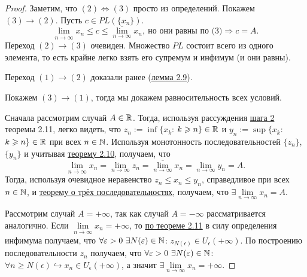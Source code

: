 \begin{proof}
    Заметим, что $(2) \Leftrightarrow (3)$ просто из определений. Покажем $(3) \to (2)$. Пусть $c \in PL (\{ x_{n} \})$.
    $$ \lim\limits_{\overline{n\to \infty}} x_{n} \leq c \leq \overline{\lim\limits_{n\to \infty}} x_{n}, \  \text{но они равны по (3)} \Rightarrow c = A. $$ Переход $(2) \to (3)$ очевиден. Множество $PL$ состоит всего из одного элемента, то есть крайне легко взять его супремум и инфимум (и они равны).

    Переход $(1) \to (2)$ доказали ранее (\hyperlink{lemm2.9}{лемма 2.9}).

    Покажем $(3) \to (1)$, тогда мы докажем равносительность всех условий.

    Сначала рассмотрим случай $A \in \mathbb{R}$. Тогда, используя рассуждения \hyperlink{step2}{шага 2} теоремы 2.11, легко видеть, что $z_{n} := \inf \{ x_{k}$: $k \geqslant n\} \in \mathbb{R}$ и $y_{n} := \sup \{ x_{k}$: $k \geqslant n\} \in \mathbb{R}$ при всех $n \in \mathbb{N}$. Используя монотонность последовательностей $\{ z_{n} \}$, $\{ y_{n} \}$ и учитывая \hyperlink{thm2.10}{теорему 2.10}, получаем, что
    $$ \lim\limits_{\overline{n\to \infty}} x_{n} = \lim\limits_{n\to \infty} z_{n} = \overline{\lim\limits_{n\to \infty}} x_{n} = \lim\limits_{n\to \infty} y_{n} = A.$$
    Тогда, используя очевидное неравенство $z_{n} \leq x_{n} \leq y_{n}$, справедливое при всех $n \in \mathbb{N}$, и \hyperlink{thm2.4}{теорему о трёх последовательностях}, получаем, что $\exists \lim\limits_{n\to \infty} x_{n} = A$.
    
    Рассмотрим случай $A = +\infty$, так как случай $A = -\infty$ рассматривается аналогично. Если $\lim\limits_{\overline{n\to \infty}} x_{n} = +\infty$, то \hyperlink{thm2.11}{по теореме 2.11} в силу определения инфимума получаем, что $\forall \varepsilon > 0 \  \exists N (\varepsilon) \in \mathbb{N}$: $z_{N (\epsilon)} \in U_{\epsilon} (+ \infty)$. По построению последовательности $z_{n}$ получаем, что $\forall \varepsilon > 0 \  \exists N (\varepsilon) \in \mathbb{N}$: $\forall n \geq N (\epsilon) \hookrightarrow x_{n} \in U_{\epsilon} (+ \infty)$, а значит $\exists \lim\limits_{n\to \infty} x_{n} = +\infty$.
\end{proof}

